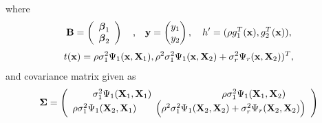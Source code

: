 where 
\[ 
{\bf B}=
\left(\begin{array}{cc}
{\boldsymbol{\beta}}_1\\
{\boldsymbol{\beta}}_2
\end{array} \right)
\quad \mbox{,}
\quad 
{\bf y}=
\begin{pmatrix}
y_1\\
y_2
\end{pmatrix}, 
\quad
h'=(\rho g_1^T({\bf x}),g_2^T({\bf x})),
\]
\begin{equation}
t({\bf x})=\rho \sigma_1^2 \Psi_1({\bf x},{\bf X}_1), \rho^2\sigma_1^2\Psi_1({\bf x},{\bf X}_2)+\sigma_r^2\Psi_r({\bf x},{\bf X}_2))^T,
\end{equation}
and covariance matrix given as
\[ {\boldsymbol{\Sigma}}=
\left(\begin{array}{cc}\label{cokcovv}
\sigma_{1}^2\Psi_1({\bf X}_1,{\bf X}_1)   ~~~~~~~~~~~~~~~~~~~~ ~~ \rho\sigma_{1}^2\Psi_1({\bf X}_1,{\bf X}_2)\\
\rho\sigma_{1}^2\Psi_1({\bf X}_2,{\bf X}_1)  ~~~~~~ \Big(\rho^2\sigma_{1}^2\Psi_1({\bf X}_2,{\bf X}_2) + \sigma_{r}^2\Psi_r({\bf X}_2,{\bf X}_2)\Big)
\end{array} \right)\]

